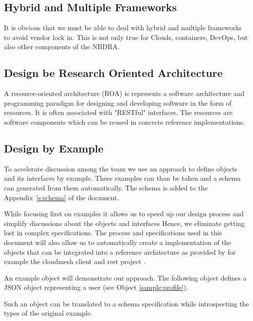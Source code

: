 \documentclass[10pt]{article}
\begin{document}
\subsection{Hybrid and Multiple Frameworks}

It is obvious that we must be able to deal with hybrid and multiple
frameworks to avoid vendor lock in. This is not only true for Clouds,
containers, DevOps, but also other components of the NBDRA. 

\subsection{Design be Research Oriented Architecture}

A resource-oriented architecture (ROA) is represents a software
architecture and programming paradigm for designing and developing
software in the form of resources. It is often associated with
"RESTful" interfaces. The resources are software components which can
be reused in concrete reference implementations. 

\subsection{Design by Example}

To accelerate discussion among the team we use an approach to define
objects and its interfaces by example. These examples can than be taken
and a schema can generated from them automatically. The schema is added to the
Appendix~\ref{s:schema} of the document. 

While focusing first on examples it allows us to speed up our design
process and simplify discussions about the objects and interfaces
Hence, we eliminate getting lost in complex specifications. The
process and specifications used in this document will also allow us to
automatically create a implementation of the objects that can be
integrated into a reference architecture as provided by for example
the cloudmesh client and rest project \cite{www-cloudmesh-client}\cite{cloudmesh-nist}.

An example object will demonstrate our approach. The following object
defines a JSON object representing a user (see Object \ref{sample:profile}). 


Such an object can be translated to a schema specification 
while introspecting the types of the original example. 
\end{document}
